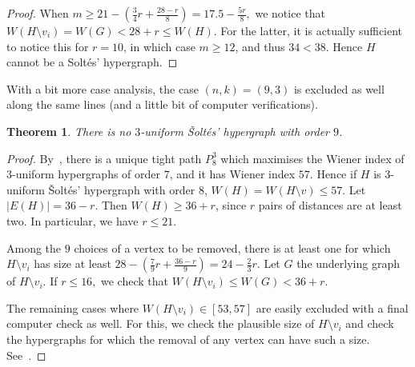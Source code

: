 \documentclass[a4paper,11pt]{article}
\newcommand*{\abs}[1]{\lvert #1\rvert}
\newtheorem{thm}[defi]{Theorem}
\begin{document}
\begin{proof}
    When $m\ge 21-\left(\frac 34 r + \frac{28-r}{8}\right)=17.5-\frac{5r}{8},$
    we notice that $W(H \setminus v_i)=W(G) < 28+r \le W(H)$.
    For the latter, it is actually sufficient to notice this for $r=10$, in which case $m \ge 12$, and thus $34<38$.
    Hence $H$ cannot be a Solt\'es' hypergraph.    
\end{proof}

With a bit more case analysis, the case $(n,k)=(9,3)$ is excluded as well along the same lines (and a little bit of computer verifications).

\begin{thm}\label{thm:no3unif_n9}
     There is no $3$-uniform \v Solt\'es' hypergraph with order $9$.
\end{thm}

\begin{proof}
    By~\cite[Thm.~1]{CGSTT23+}, there is a unique tight path $P_{8}^3$ which maximises the Wiener index of $3$-uniform hypergraphs of order $7$, and it has Wiener index $57$.
    Hence if $H$ is $3$-uniform \v Solt\'es' hypergraph with order $8$, $W(H)=W(H \setminus v) \le 57.$
    Let $\abs{E(H)}=36-r.$
    Then $W(H) \ge 36+r$, since $r$ pairs of distances are at least two.
    In particular, we have $r \le 21.$

    Among the $9$ choices of a vertex to be removed, there is at least one for which $H \setminus v_i$ has size at least $28-\left( \frac79 r+\frac{36-r}9\right)=24-\frac 23 r.$
    Let $G$ the underlying graph of $H \setminus v_i.$
    If $r \le 16,$ we check that $W( H \setminus v_i) \le W(G) < 36+r.$

    The remaining cases where $W( H \setminus v_i) \in [53,57]$ are easily excluded with a final computer check as well.
    For this, we check the plausible size of $H\setminus v_i$ and check the hypergraphs for which the removal of any vertex can have such a size. See~\cite[doc. ]{C25github}.
\end{proof}
\end{document}
